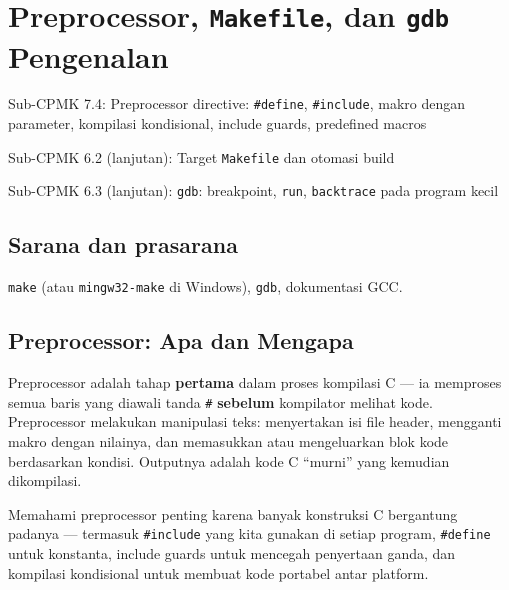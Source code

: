 \documentclass[../main.tex]{subfiles}
\begin{document}
\chapter{Preprocessor, \texttt{Makefile}, dan \texttt{gdb} Pengenalan}

\begin{subcpmk}
  \item Sub-CPMK 7.4: Preprocessor directive: \texttt{\#define}, \texttt{\#include}, makro dengan parameter, kompilasi kondisional, include guards, predefined macros
  \item Sub-CPMK 6.2 (lanjutan): Target \texttt{Makefile} dan otomasi build
  \item Sub-CPMK 6.3 (lanjutan): \texttt{gdb}: breakpoint, \texttt{run}, \texttt{backtrace} pada program kecil
\end{subcpmk}


\section{Sarana dan prasarana}
\texttt{make} (atau \texttt{mingw32-make} di Windows), \texttt{gdb}, dokumentasi GCC.

\section{Preprocessor: Apa dan Mengapa}

Preprocessor adalah tahap \textbf{pertama} dalam proses kompilasi C --- ia memproses semua baris yang diawali tanda \texttt{\#} \textbf{sebelum} kompilator melihat kode. Preprocessor melakukan manipulasi teks: menyertakan isi file header, mengganti makro dengan nilainya, dan memasukkan atau mengeluarkan blok kode berdasarkan kondisi. Outputnya adalah kode C ``murni'' yang kemudian dikompilasi.

Memahami preprocessor penting karena banyak konstruksi C bergantung padanya --- termasuk \texttt{\#include} yang kita gunakan di setiap program, \texttt{\#define} untuk konstanta, include guards untuk mencegah penyertaan ganda, dan kompilasi kondisional untuk membuat kode portabel antar platform.

\end{document}
